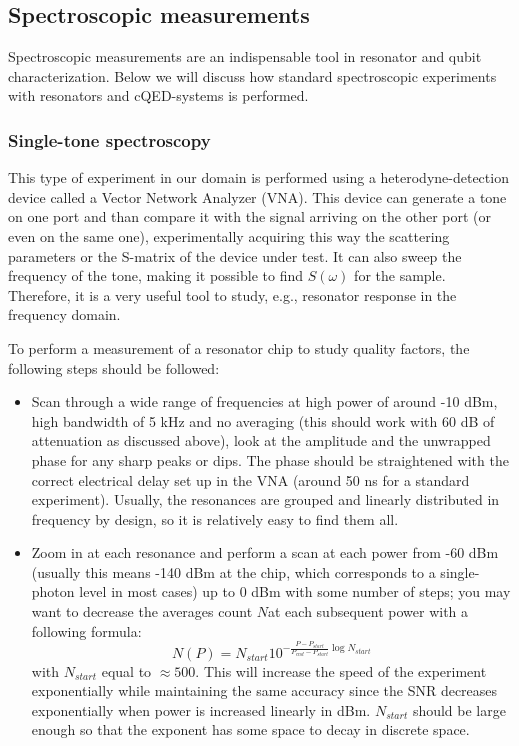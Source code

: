 \subsection{Spectroscopic measurements}

Spectroscopic measurements are an indispensable tool in resonator and qubit characterization. Below we will discuss how standard spectroscopic experiments with resonators and cQED-systems is performed.

\subsubsection{Single-tone spectroscopy}

This type of experiment in our domain is performed using a heterodyne-detection device called a Vector Network Analyzer (VNA). This device can  generate a tone on one port and than compare it with the signal arriving on the other port (or even on the same one), experimentally acquiring this way the scattering parameters or the S-matrix of the device under test. It can also sweep the frequency of the tone, making it possible to find $S(\omega)$ for the sample. Therefore, it is a very useful tool to study, e.g., resonator response in the frequency domain.

To perform a measurement of a resonator  chip to study quality factors, the following steps should be followed:
\begin{itemize}[topsep=5pt, itemsep=5pt]
\item Scan through a wide range of frequencies at high power of around -10 dBm, high bandwidth of 5 kHz and no averaging (this should work with 60 dB of attenuation as discussed  above), look at the amplitude and the unwrapped phase for any sharp peaks or dips. The phase should be straightened with the correct electrical delay set up in the VNA (around 50 ns for a standard experiment). Usually, the resonances are grouped and linearly distributed in frequency by design, so it is relatively easy to find them all.
\item Zoom in at each resonance and perform a scan at each power from -60 dBm (usually this means -140 dBm at the chip, which corresponds to a single-photon level in most cases) up to 0 dBm with some number of steps; you may want to decrease the averages count $N$at each subsequent power with a following formula:
\[
N(P) = N_{start} 10^{-\frac{P-P_{start}}{P_{end}-P_{start}} \log N_{start} }
\]
with $N_{start}$ equal to $\approx 500$. This will increase the speed of the experiment exponentially while maintaining the same accuracy since the SNR decreases exponentially when power is increased linearly in dBm. $N_{start}$ should be large enough so that the exponent has some space to decay in discrete space.
\end{itemize}

